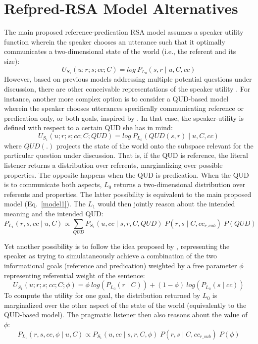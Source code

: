 \section{Refpred-RSA Model Alternatives}
The main proposed reference-predication RSA model assumes a speaker utility function wherein the speaker chooses an utterance such that it optimally communicates a two-dimensional state of the world (i.e., the referent and its size):
\begin{equation*}
U_{S_1} (u; r; s; cc; C) = log \: P_{L_0} (s, r \mid u, C, cc) 
\end{equation*}
However, based on previous models addressing multiple potential questions under discussion, there are other conceivable representations of the speaker utility \parencite[cf.][]{kao2014nonliteral, yoon2016talking}. For instance, another more complex option is to consider a QUD-based model wherein the speaker chooses utterances specifically communicating reference or predication only, or both goals, inspired by \textcite{kao2014nonliteral}. In that case, the speaker-utility is defined with respect to a certain QUD she has in mind: 
\begin{equation*}
U_{S_1} (u; r; s; cc; C; QUD) = log \: P_{L_0} (QUD(s, r) \mid u, C, cc)
\end{equation*} 
where $QUD(.)$ projects the state of the world onto the subspace relevant for the particular question under discussion. That is, if the QUD is reference, the literal listener returns a distribution over referents, marginalizing over possible properties. The opposite happens when the QUD is predication. When the QUD is to communicate both aspects, $L_0$ returns a two-dimensional distribution over referents and properties. The latter possibility is equivalent to the main proposed model (Eq.~\ref{model1}). The $L_1$ would then jointly reason about the intended meaning and the intended QUD: 
\begin{equation*}
P_{L_1} (r, s, cc \mid u, C) \propto \sum_{QUD} P_{S_1} (u, cc \mid s, r, C, QUD) \; P(r, s \mid C, cc_{r\_sub}) \; P(QUD)
\end{equation*} 

Yet another possibility is to follow the idea proposed by \textcite{yoon2016talking}, representing the speaker as trying to simulataneously achieve a combination of the two informational goals (reference and predication) weighted by a free parameter $\phi$ representing referential weight of the sentence:
\begin{equation*}
U_{S_1} (u; r; s; cc; C; \phi) = \phi \: log (P_{L_0}(r \mid C)) + (1 - \phi) \: log( P_{L_0}(s \mid cc))
\end{equation*} 
To compute the utility for one goal, the distribution returned by $L_0$ is marginalized over the other aspect of the state of the world (equivalently to the QUD-based model). The pragmatic listener then also reasons about the value of $\phi$:
\begin{equation*}
P_{L_1} (r, s, cc, \phi \mid u, C) \propto P_{S_1} (u, cc \mid s, r, C, \phi) \; P(r, s \mid C, cc_{r\_sub}) \; P(\phi)
\end{equation*} 

